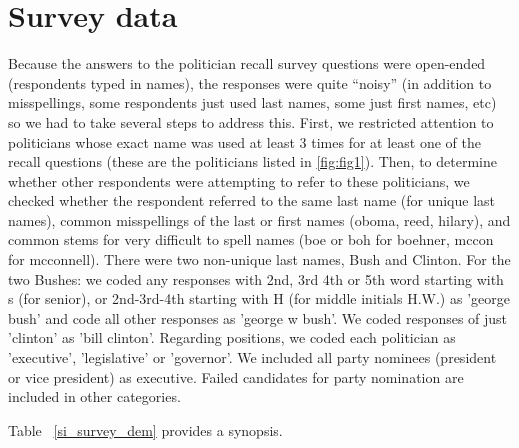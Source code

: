 \documentclass[12pt, letterpaper]{article}
\begin{document}
\section{Survey data}

Because the answers to the politician recall survey questions were open-ended (respondents typed in names), the responses were quite ``noisy'' (in addition to misspellings, some respondents just used last names, some just first names, etc) so we had to take several steps to address this.  First, we restricted attention to politicians whose exact name was used at least 3 times for at least one of the recall questions (these are the politicians listed in \ref{fig:fig1}). Then, to determine whether other respondents were attempting to refer to these politicians, we checked whether the respondent referred to the same last name (for unique last names), common misspellings of the last or first names (oboma, reed, hilary), and common stems for very difficult to spell names (boe or boh for boehner, mccon for mcconnell).  There were two non-unique last names, Bush and Clinton.  For the two Bushes: we coded any responses with 2nd, 3rd 4th or 5th word starting with s (for senior), or 2nd-3rd-4th starting with H (for middle initials H.W.) as 'george bush' and code all other responses as 'george w bush'. We coded responses of just 'clinton' as 'bill clinton'.  Regarding positions, we coded each politician as 'executive', 'legislative' or 'governor'.  We included all party nominees (president or vice president) as executive.  Failed candidates for party nomination are included in other categories.

Table ~\ref{si_survey_dem} provides a synopsis.
\end{document}
